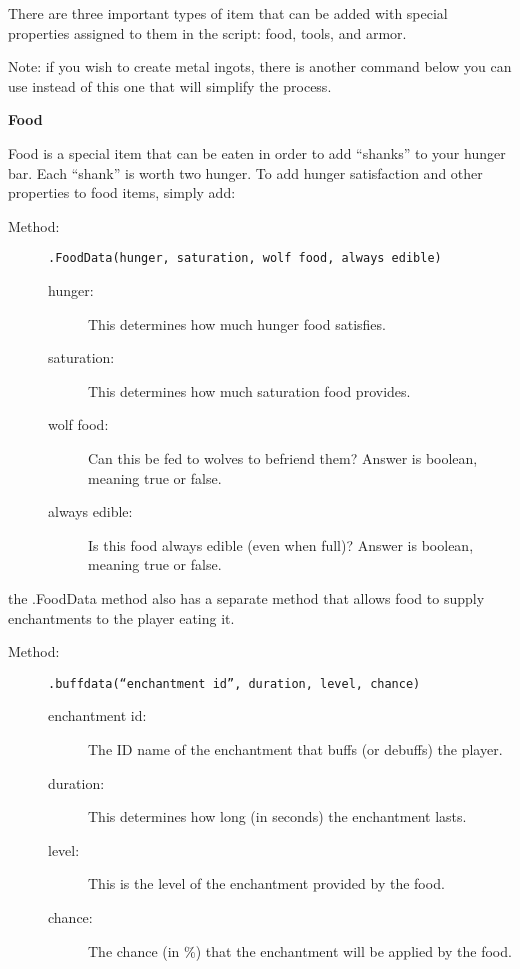 \documentclass[letterpaper,titlepage,12pt]{article}
\begin{document}
There are three important types of item that can be added with special properties assigned to them in the script: food, tools, and armor.  

Note: if you wish to create metal ingots, there is another command below you can use instead of this one that will simplify the process.

\vspace{2em}
\textbf{Food}
\vspace{1em}

Food is a special item that can be eaten in order to add ``shanks'' to your hunger bar.  Each ``shank'' is worth two hunger.  To add hunger satisfaction and other properties to food items, simply add:

\begin{description}
\item[Method:] \texttt{.FoodData(hunger, saturation, wolf food, always edible)}
\begin{description}
\item [hunger:] This determines how much hunger food satisfies.
\item [saturation:] This determines how much saturation food provides.
\item [wolf food:] Can this be fed to wolves to befriend them?  Answer is boolean, meaning true or false.
\item [always edible:] Is this food always edible (even when full)?  Answer is boolean, meaning true or false.
\end{description}
\end{description}

the .FoodData method also has a separate method that allows food to supply enchantments to the player eating it.

\begin{description}
\item[Method:] \texttt{.buffdata(``enchantment id'', duration, level, chance)}
\begin{description}
\item [enchantment id:] The ID name of the enchantment that buffs (or debuffs) the player.
\item [duration:] This determines how long (in seconds) the enchantment lasts.
\item [level:] This is the level of the enchantment provided by the food.
\item [chance:] The chance (in \%) that the enchantment will be applied by the food.
\end{description}
\end{description}
\end{document}
